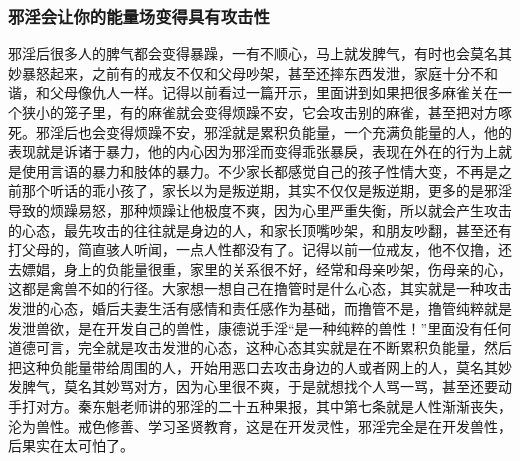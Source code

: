 \subsubsection{邪淫会让你的能量场变得具有攻击性}

邪淫后很多人的脾气都会变得暴躁，一有不顺心，马上就发脾气，有时也会莫名其妙暴怒起来，之前有的戒友不仅和父母吵架，甚至还摔东西发泄，家庭十分不和谐，和父母像仇人一样。记得以前看过一篇开示，里面讲到如果把很多麻雀关在一个狭小的笼子里，有的麻雀就会变得烦躁不安，它会攻击别的麻雀，甚至把对方啄死。邪淫后也会变得烦躁不安，邪淫就是累积负能量，一个充满负能量的人，他的表现就是诉诸于暴力，他的内心因为邪淫而变得乖张暴戾，表现在外在的行为上就是使用言语的暴力和肢体的暴力。不少家长都感觉自己的孩子性情大变，不再是之前那个听话的乖小孩了，家长以为是叛逆期，其实不仅仅是叛逆期，更多的是邪淫导致的烦躁易怒，那种烦躁让他极度不爽，因为心里严重失衡，所以就会产生攻击的心态，最先攻击的往往就是身边的人，和家长顶嘴吵架，和朋友吵翻，甚至还有打父母的，简直骇人听闻，一点人性都没有了。记得以前一位戒友，他不仅撸，还去嫖娼，身上的负能量很重，家里的关系很不好，经常和母亲吵架，伤母亲的心，这都是禽兽不如的行径。大家想一想自己在撸管时是什么心态，其实就是一种攻击发泄的心态，婚后夫妻生活有感情和责任感作为基础，而撸管不是，撸管纯粹就是发泄兽欲，是在开发自己的兽性，康德说手淫“是一种纯粹的兽性！”里面没有任何道德可言，完全就是攻击发泄的心态，这种心态其实就是在不断累积负能量，然后把这种负能量带给周围的人，开始用恶口去攻击身边的人或者网上的人，莫名其妙发脾气，莫名其妙骂对方，因为心里很不爽，于是就想找个人骂一骂，甚至还要动手打对方。秦东魁老师讲的邪淫的二十五种果报，其中第七条就是人性渐渐丧失，沦为兽性。戒色修善、学习圣贤教育，这是在开发灵性，邪淫完全是在开发兽性，后果实在太可怕了。

